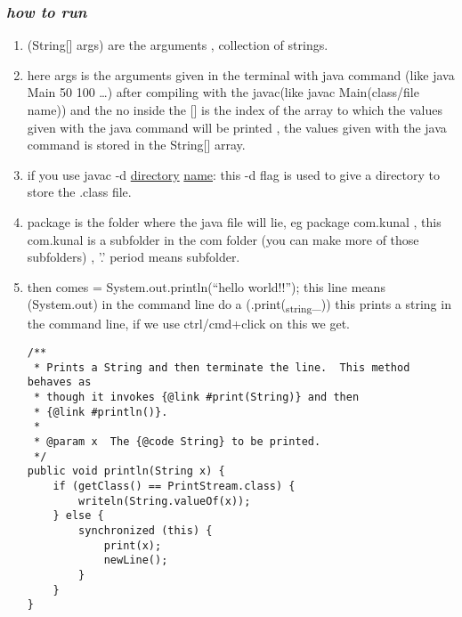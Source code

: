\documentclass[11pt]{article}
\begin{document}
\subsubsection{\emph{how to run}}
\label{sec:orga7fae0a}
\begin{enumerate}
\item (String[] args) are the arguments , collection of strings.
\item here args is the arguments given in the terminal with java command (like java Main 50 100 \ldots{}) after compiling with the javac(like javac Main(class/file name)) and the no inside the [] is the index of the array to which the values given with the java command will be printed , the values given with the java command is stored in the String[] array.
\item if you use javac -d \uline{directory} \uline{name}: this -d flag is used to give a directory to store the .class file.
\item package is the folder where the java file will lie, eg package com.kunal , this com.kunal is a subfolder in the com folder (you can make more of those subfolders) , '.' period means subfolder.
\item then comes = System.out.println(``hello world!!''); this line means (System.out) in the command line do a (.print(\textsubscript{string}\_)) this prints a string in the command line, if we use ctrl/cmd+click on this we get.
\begin{verbatim}
/**
 * Prints a String and then terminate the line.  This method behaves as
 * though it invokes {@link #print(String)} and then
 * {@link #println()}.
 *
 * @param x  The {@code String} to be printed.
 */
public void println(String x) {
    if (getClass() == PrintStream.class) {
        writeln(String.valueOf(x));
    } else {
        synchronized (this) {
            print(x);
            newLine();
        }
    }
}
\end{verbatim}


\end{enumerate}
\end{document}
